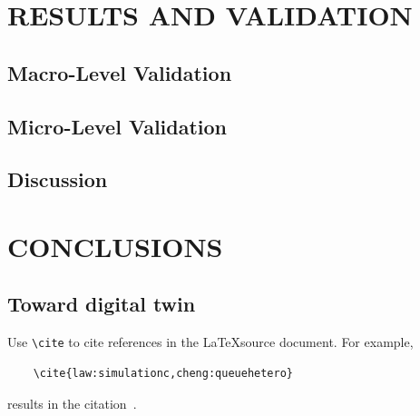 \documentclass{scspaperproc}
\theoremstyle{scsthe}
\begin{document}
    \section{RESULTS AND VALIDATION}
    \label{sec:results}
    \subsection{Macro-Level Validation}
    \subsection{Micro-Level Validation}

    \subsection{Discussion}


    \section{CONCLUSIONS}
    \label{sec:conclusions}

    \subsection{Toward digital twin}

    Use \verb+\cite+ to cite references in the \LaTeX source document. For example,

    \begin{verbatim}
    \cite{law:simulationc,cheng:queuehetero}
    \end{verbatim} %

    results in the citation~\cite{law:simulationc,cheng:queuehetero}.




\end{document}
